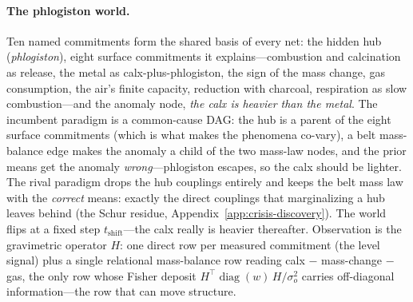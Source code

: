 \documentclass[runningheads]{llncs}
\begin{document}
\paragraph{The phlogiston world.}
Ten named commitments form the shared basis of every net: the hidden hub
(\emph{phlogiston}), eight surface commitments it explains---combustion and calcination as
release, the metal as calx-plus-phlogiston, the sign of the mass change, gas consumption,
the air's finite capacity, reduction with charcoal, respiration as slow combustion---and the
anomaly node, \emph{the calx is heavier than the metal}. The incumbent paradigm is a
common-cause DAG: the hub is a parent of the eight surface commitments (which is what makes
the phenomena co-vary), a belt mass-balance edge makes the anomaly a child of the two
mass-law nodes, and the prior means get the anomaly \emph{wrong}---phlogiston escapes, so
the calx should be lighter. The rival paradigm drops the hub couplings entirely and keeps
the belt mass law with the \emph{correct} means: exactly the direct couplings that
marginalizing a hub leaves behind (the Schur residue,
Appendix~\ref{app:crisis-discovery}). The world flips at a fixed step
$t_{\text{shift}}$---the calx really is heavier thereafter. Observation is the gravimetric
operator $H$: one direct row per measured commitment (the level signal) plus a single
relational mass-balance row reading calx $-$ mass-change $-$ gas, the only row whose Fisher
deposit $H^{\!\top}\!\operatorname{diag}(w)\,H/\sigma_o^2$ carries off-diagonal
information---the row that can move structure.
\end{document}
